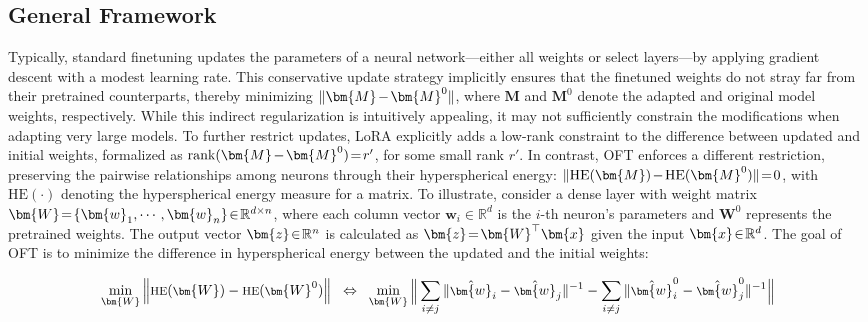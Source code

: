 \subsection{General Framework}

Typically, standard finetuning updates the parameters of a neural network—either all weights or select layers—by applying gradient descent with a modest learning rate. This conservative update strategy implicitly ensures that the finetuned weights do not stray far from their pretrained counterparts, thereby minimizing $\thickmuskip=2mu \medmuskip=2mu \| \bm{M} - \bm{M}^0\|$, where $\bm{M}$ and $\bm{M}^0$ denote the adapted and original model weights, respectively. While this indirect regularization is intuitively appealing, it may not sufficiently constrain the modifications when adapting very large models. To further restrict updates, LoRA explicitly adds a low-rank constraint to the difference between updated and initial weights, formalized as $\thickmuskip=2mu \medmuskip=2mu \text{rank}(\bm{M} - \bm{M}^0)=r'$, for some small rank $r'$. In contrast, OFT enforces a different restriction, preserving the pairwise relationships among neurons through their hyperspherical energy: $\thickmuskip=2mu \medmuskip=2mu \| \text{HE}(\bm{M})-\text{HE}(\bm{M}^0) \|=0$, with $\text{HE}(\cdot)$ denoting the hyperspherical energy measure for a matrix. To illustrate, consider a dense layer with weight matrix $\thickmuskip=2mu \medmuskip=2mu \bm{W}=\{\bm{w}_1,\cdots,\bm{w}_n\}\in\mathbb{R}^{d\times n}$, where each column vector $\bm{w}_i\in\mathbb{R}^{d}$ is the $i$-th neuron's parameters and $\bm{W}^0$ represents the pretrained weights. The output vector $\thickmuskip=2mu \medmuskip=2mu \bm{z}\in\mathbb{R}^n$ is calculated as $\thickmuskip=2mu \medmuskip=2mu \bm{z}=\bm{W}^\top\bm{x}$ given the input $\thickmuskip=2mu \medmuskip=2mu \bm{x}\in\mathbb{R}^d$. The goal of OFT is to minimize the difference in hyperspherical energy between the updated and the initial weights:

\begin{equation}\label{eq:oft_principle}
\footnotesize
\min_{\bm{W}} \left\| \text{HE}(\bm{W})-\text{HE}(\bm{W}^0)\right\|~~\Leftrightarrow~~\min_{\bm{W}} \bigg{\|} \sum_{i\neq j} \|\hat{\bm{w}}_i-\hat{\bm{w}}_j\|^{-1}-\sum_{i\neq j} \|\hat{\bm{w}}^0_i-\hat{\bm{w}}^0_j\|^{-1}\bigg{\|}
\end{equation}

